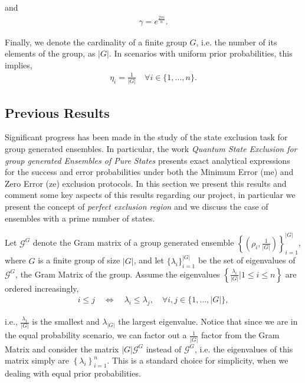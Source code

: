 \documentclass[12pt,letterpaper]{article}
\begin{document}
and
\begin{align*}
	\gamma = e^{\frac{2\pi i}{n}}.
\end{align*}

Finally, we denote the cardinality of a finite group $G$, i.e. the number of its elements of the group, as $|G|$. In scenarios with uniform prior probabilities, this implies,
\begin{align*}
	\eta_i = \frac{1}{|G|}\quad \forall i\in\{1,...,n\}.
\end{align*}

\newpage
\subsection{Previous Results}\label{sectionPreviousResults}

\hspace{20pt}Significant progress has been made in the study of the state exclusion task for group generated ensembles. In particular, the work \emph{Quantum State Exclusion for group generated Ensembles of Pure States}\cite{MainPaper} presents exact analytical expressions for the success and error probabilities under both the Minimum Error (\gls{me}) and Zero Error (\gls{ze}) exclusion protocols. In this section we present this results and comment some key aspects of this results regarding our project, in particular we present the concept of \emph{perfect exclusion region} and we discuss the case of ensembles with a prime number of states.

Let $\mathcal{G}^G$ denote the Gram matrix of a group generated ensemble $\left\{ \left( \rho_i, \frac{1}{|G|} \right) \right\}_{i=1}^{|G|}$, where $G$ is a finite group of size $|G|$, and let $\{\lambda_i\}_{i=1}^{|G|}$ be the set of eigenvalues of $\mathcal{G}^G$, the Gram Matrix of the group. Assume the eigenvalues $\left\{\frac{\lambda_i}{|G|}|1\leq i \leq n\right\}$ are ordered increasingly,
\begin{align*}
	i \leq j \quad \Leftrightarrow \quad \lambda_i \leq \lambda_j, \quad \forall i,j \in \{1, \dots, |G|\},
\end{align*}

i.e., $\frac{\lambda_1}{|G|}$ is the smallest and $\lambda_{|G|}$ the largest eigenvalue. Notice that since we are in the equal probability scenario, we can factor out a $\frac{1}{|G|}$ factor from the Gram Matrix and consider the matrix $|G|\mathcal{G}^G$ instead of $\mathcal{G}^G$, i.e. the eigenvalues of this matrix simply are $\left\{\lambda_i\right\}_{i=1}^n$. This is a standard choice for simplicity, when we dealing with equal prior probabilities.
\end{document}
